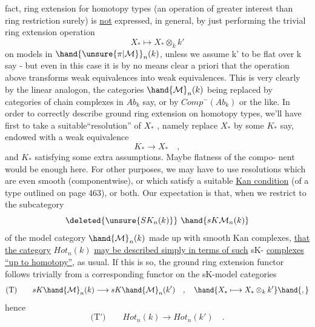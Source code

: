 fact,  ring extension for homotopy types (an operation of greater interest
than ring restriction surely) is \uline{not} expressed,  in general,  by just
performing the trivial ring extension operation
\[ X_{*} \mapsto X_{*} \otimes_{k} k' \]
on models in $\hand{\unsure{\pi|\mathcal{M}}}_{n}(k)$,  unless we assume k' to be flat over k say  -  but
even in this case it is by no means clear a priori that the operation
above transforms weak equivalences into weak equivalences.  This is very
clearly  by the linear analogon,  the categories $\hand{\mathcal{M}}_{n}(k)$  being
replaced by  categories of chain complexes in  $Ab_{k}$ say,  or by $Comp^{-}(Ab_{k})$
or the like.   In order to correctly describe ground ring extension on
homotopy types,  we'll have first to take a suitable``resolution'' of $X_{*}$ ,
namely replace $X_{*}$  by some  $K_{*}$  say,  endowed with a weak equivalence
\[ K_{*} \to X_{*} \quad , \]
and $K_{*}$ satisfying some extra assumptions.  Maybe flatness of the compo-%
nent would be enough here.  For other purposes,  we may have to use
resolutions which are even smooth (componentwise),  or which satisfy a
suitable \uline{Kan condition}  (of a type outlined on page 463),  or both.
Our expectation is that,  when we restrict to the subcategory
\[ \deleted{\unsure{SK_{n}(k)}} \ \hand{sK\mathcal{M}_{n}(k)} \]
of the model category $\hand{\mathcal{M}}_{n}(k)$ made up with smooth Kan complexes,  \uline{that}
\uline{the category} $Hot_{n}(k)$  \uline{may be described simply in  terms of such}  sK-%
\uline{complexes} \uline{``up to h\hand{$\smile$}omotopy''},  as usual.  If this is so,  the ground ring
extension functor   follows trivially from a corresponding functor on
the  sK-model categories
\[ \text{(T)} \qquad sK\hand{\mathcal{M}}_{n}(k) \longrightarrow sK\hand{\mathcal{M}}_{n}(k') \quad , \quad \hand{X_{*} \longmapsto X_{*} \otimes_{k} k'} \hand{,} \]
hence
\[ \text{(T')} \qquad Hot_{n}(k) \longrightarrow Hot_{n}(k') \quad . \]

